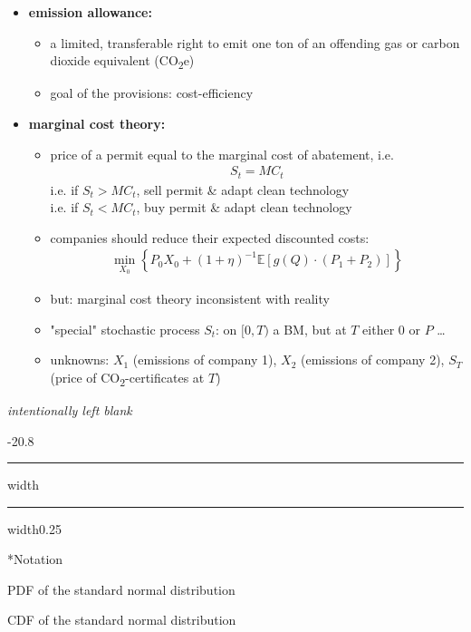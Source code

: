 \documentclass[a4paper,landscape,8pt,fleqn]{scrartcl}
\makeatletter
\renewcommand{\emph}[1]{\textbf{#1}}
\renewcommand{\section}{\@startsection{section}{1}{0mm}%
{-2\baselineskip}{0.8\baselineskip}%
{\hrule depth 0.2pt width\columnwidth\hrule depth1.5pt
width0.25\columnwidth\vspace*{1.2em}\Large\bfseries}}
\makeatother
\begin{document}
\begin{multicols*}{4}
\begin{itemize}
\begin{itemize}
\end{itemize}
\item \emph{emission allowance:}
\begin{itemize}
\item a limited, transferable right to emit one ton of an offending gas or carbon dioxide equivalent (CO\textsubscript{2}e)
\item goal of the provisions: cost-efficiency
\end{itemize}
\item \emph{marginal cost theory:}
\begin{itemize}
\item price of a permit equal to the marginal cost of abatement, i.e.
\begin{align*}
S_t = MC_t
\end{align*}
i.e. if $S_t > MC_t$, sell permit \& adapt clean technology \\
i.e. if $S_t < MC_t$, buy permit \& adapt clean technology
\item companies should reduce their expected discounted costs:
\begin{align*}
\min_{X_0} \left\lbrace P_0 X_0 + (1 + \eta)^{-1} \mathbb{E} \left[ g(Q) \cdot (P_1 + P_2) \right] \right\rbrace
\end{align*}
\item but: marginal cost theory inconsistent with reality
\item "special" stochastic process $S_t$: on $[0,T)$ a BM, but at $T$ either $0$ or $P$ \ldots
\item unknowns: $X_1$ (emissions of company 1), $X_2$ (emissions of company 2), $S_T$ (price of CO\textsubscript{2}-certificates at $T$)
\end{itemize}

\end{itemize}

\columnbreak
\begin{center}
\textit{intentionally left blank}
\end{center}
\vfill
\section*{Notation}

\begin{description}[style=multiline,leftmargin=1cm,font=\textbf]
\item[$\varphi$] PDF of the standard normal distribution
\item[$\Phi$] CDF of the standard normal distribution
\end{description}


\end{multicols*}
\end{document}
